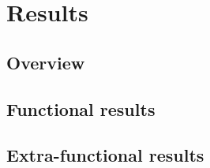 \chapter{Results}
\section{Overview}

\section{Functional results}

\section{Extra-functional results}
